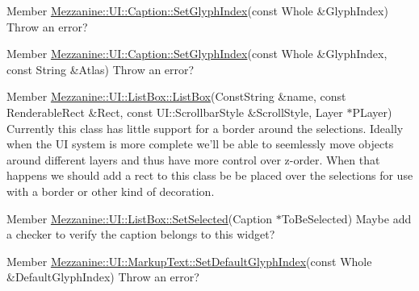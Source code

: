 \label{todo__todo000032}
\hypertarget{todo__todo000032}{}
 
\begin{DoxyDescription}
\item[Member \hyperlink{classMezzanine_1_1UI_1_1Caption_a2cc9da9ae1e10cd5829117f0d473186a}{Mezzanine::UI::Caption::SetGlyphIndex}(const Whole \&GlyphIndex) ]Throw an error? 
\end{DoxyDescription}

\label{todo__todo000033}
\hypertarget{todo__todo000033}{}
 
\begin{DoxyDescription}
\item[Member \hyperlink{classMezzanine_1_1UI_1_1Caption_abe41befd65e977a1bb300427d0dd5936}{Mezzanine::UI::Caption::SetGlyphIndex}(const Whole \&GlyphIndex, const String \&Atlas) ]Throw an error? 
\end{DoxyDescription}

\label{todo__todo000034}
\hypertarget{todo__todo000034}{}
 
\begin{DoxyDescription}
\item[Member \hyperlink{classMezzanine_1_1UI_1_1ListBox_a60130f372bc78fbb20f28270bbed8cf2}{Mezzanine::UI::ListBox::ListBox}(ConstString \&name, const RenderableRect \&Rect, const UI::ScrollbarStyle \&ScrollStyle, Layer $\ast$PLayer) ]Currently this class has little support for a border around the selections. Ideally when the UI system is more complete we'll be able to seemlessly move objects around different layers and thus have more control over z-\/order. When that happens we should add a rect to this class be be placed over the selections for use with a border or other kind of decoration. 
\end{DoxyDescription}

\label{todo__todo000035}
\hypertarget{todo__todo000035}{}
 
\begin{DoxyDescription}
\item[Member \hyperlink{classMezzanine_1_1UI_1_1ListBox_a81ddebed01b1503478c2fa7b75ce4b24}{Mezzanine::UI::ListBox::SetSelected}(Caption $\ast$ToBeSelected) ]Maybe add a checker to verify the caption belongs to this widget? 
\end{DoxyDescription}

\label{todo__todo000037}
\hypertarget{todo__todo000037}{}
 
\begin{DoxyDescription}
\item[Member \hyperlink{classMezzanine_1_1UI_1_1MarkupText_a8455dbc85e8ed56f366c14f1cab24f49}{Mezzanine::UI::MarkupText::SetDefaultGlyphIndex}(const Whole \&DefaultGlyphIndex) ]Throw an error? 
\end{DoxyDescription}

